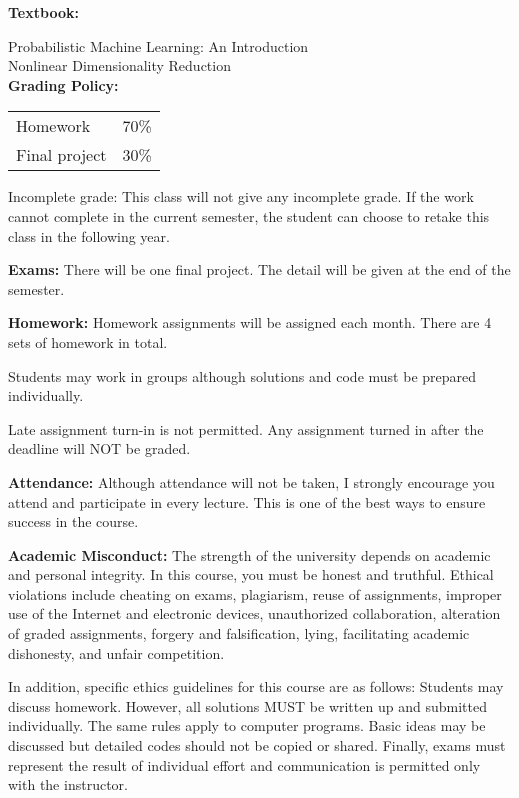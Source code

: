 \documentclass[a4paper,10pt]{article}
\begin{document}
\textbf{Textbook:} 

Probabilistic Machine Learning: An Introduction \\
Nonlinear Dimensionality Reduction \\




\textbf{Grading Policy:}

\begin{tabular}{lr}
Homework & 70\%\\ 
Final project & 30\% \\
\end{tabular}

Incomplete grade: This class will not give any
incomplete grade. If the work cannot complete in the
current semester, the student can choose to retake this
class in the following year.




\textbf{Exams:} There will be one final project. The detail will be given at the end of the semester. 


\textbf{Homework:} Homework assignments will be assigned each month. There are 4 sets of homework in total. 

Students may work in groups although solutions and code must be prepared individually.

Late assignment turn-in is not permitted. Any assignment turned in after the deadline will NOT be graded.




\textbf{Attendance:} Although attendance will not be taken, I strongly encourage you attend and participate in every lecture. This is one of the best ways to ensure success in the course.






\textbf{Academic Misconduct:} The strength of the university depends on academic and personal integrity. In this course, you must be honest 
and truthful. Ethical violations include cheating on exams, plagiarism, reuse of assignments, improper use 
of the Internet and electronic devices, unauthorized collaboration, alteration of graded assignments, forgery 
and falsification, lying, facilitating academic dishonesty, and unfair competition.

In addition, specific ethics guidelines for this course are as follows: Students may discuss homework. However, 
all solutions MUST be written up and submitted individually. The same rules apply to computer programs. 
Basic ideas may be discussed but detailed codes should not be copied or shared. Finally, exams must 
represent the result of individual effort and communication is permitted only with the instructor.
\end{document}
